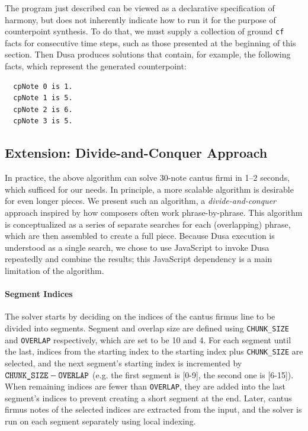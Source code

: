 The program just described can be viewed as a declarative specification of
harmony, but does not inherently indicate how to run it for
the purpose of
counterpoint synthesis. To do that, we must supply a 
collection of ground \verb|cf| facts for consecutive time steps,
such as those presented at the beginning of this section.
Then Dusa produces solutions that contain, for example, the following
facts, which represent the generated counterpoint:
\begin{verbatim}
  cpNote 0 is 1.
  cpNote 1 is 5.
  cpNote 2 is 6.
  cpNote 3 is 5.
\end{verbatim}


\subsection{Extension: Divide-and-Conquer Approach}
\label{sec:divide-and-conquer}
In practice, the above algorithm can solve 30-note cantus firmi in 1--2 seconds, which sufficed for our needs.
In principle, a more scalable algorithm is desirable for even longer pieces.
We present such an algorithm, a \emph{divide-and-conquer} approach inspired by how composers often work phrase-by-phrase.
This algorithm is conceptualized as a series of separate searches for each (overlapping) phrase, which are then assembled to create a full piece.
Because Dusa execution is understood as a single search, we chose to use JavaScript to invoke Dusa repeatedly and combine the results; this JavaScript dependency is a main limitation of the algorithm.

\paragraph{Segment Indices}

The solver starts by deciding on the indices of the cantus firmus line to be divided into segments. Segment and overlap size are defined using \verb|CHUNK_SIZE| and \verb|OVERLAP| respectively, which are set to be 10 and 4. For each segment until the last, indices from the starting index to the starting index plus \verb|CHUNK_SIZE| are selected, and the next segment's starting index is incremented by $\verb|CHUNK_SIZE|-\verb|OVERLAP|$ (e.g. the first segment is [0-9], the second one is [6-15]). When remaining indices are fewer than \verb|OVERLAP|, they are added into the last segment's indices to prevent creating a short segment at the end. Later, cantus firmus notes of the selected indices are extracted from the input, and the solver is run on each segment separately using local indexing.

